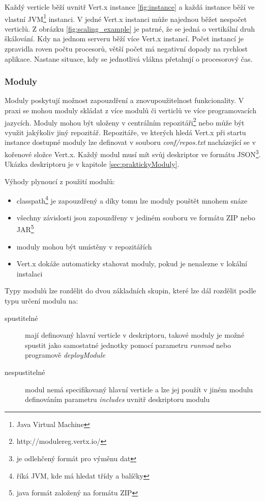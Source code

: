 Každý verticle běží uvnitř Vert.x instance \vref{fig:instance} a každá instance běží ve vlastní JVM\footnote{Java Virtual Machine} instanci. V jedné Vert.x instanci může najednou běžet nespočet verticlů. Z obrázku \ref{fig:scaling_example} je patrné, že se jedná o vertikální druh škálování. Kdy na jednom serveru běží více Vert.x instancí. Počet instancí je zpravidla roven počtu procesorů, větší počet má negativní dopady na rychlost aplikace. Nastane situace, kdy se jednotlivá vlákna přetahují o procesorový čas.

\subsubsection{Moduly}\label{sub:moduly}

Moduly poskytují možnost zapouzdření a znovupoužitelnost funkcionality. V praxi se mohou moduly skládat z více modulů či verticlů ve více programovacích jazycích. Moduly mohou být uloženy v centrálním repozitáři\footnote{http://modulereg.vertx.io/} nebo může být využit jakýkoliv jiný repozitář. Repozitáře, ve kterých hledá Vert.x při startu instance dostupné moduly lze definovat v souboru \emph{conf/repos.txt} nacházející se v kořenové složce Vert.x. Každý modul musí mít svůj deskriptor ve formátu JSON\footnote{je odlehčený formát pro výměnu dat}. Ukázka deskriptoru je v kapitole \ref{sec:praktickyModuly}.

Výhody plynoucí z použití modulů:
\begin{itemize}
\item{classpath\footnote{říká JVM, kde má hledat třídy a balíčky} je zapouzdřený a díky tomu lze moduly pouštět mnohem snáze}
\item{všechny závislosti jsou zapouzdřeny v jediném souboru ve formátu ZIP nebo JAR\footnote{java formát založený na formátu ZIP}}
\item{moduly mohou být umístěny v repozitářích}
\item{Vert.x dokáže automaticky stahovat moduly, pokud je nenalezne v lokální instalaci}
\end{itemize}

Typy modulů lze rozdělit do dvou základních skupin, které lze dál rozdělit podle typu určení modulu na:

\begin{description}
\item[spustitelné]{mají definovaný hlavní verticle v deskriptoru, takové moduly je možné spustit jako samostatné jednotky pomocí parametru \emph{runmod} nebo programově \emph{deployModule} }
\item[nespustitelné]{modul nemá specifikovaný hlavní verticle a lze jej použít v jiném modulu definováním parametru \emph{includes} uvnitř deskriptoru modulu}
\end{description}

